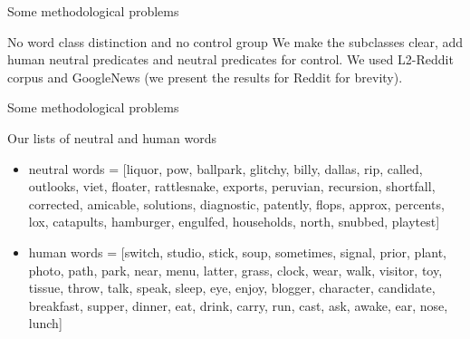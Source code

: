 \documentclass[
  10pt,
  ignorenonframetext,
  x11names, dvipsnames, bibspacing,natbib, table]{beamer}
\begin{document}
\begin{frame}{Some methodological problems}
\protect\hypertarget{some-methodological-problems-1}{}
\begin{block}{No word class distinction and no control group}
\protect\hypertarget{no-word-class-distinction-and-no-control-group}{}
We make the subclasses clear, add human neutral predicates and neutral
predicates for control. We used L2-Reddit corpus and GoogleNews (we
present the results for Reddit for brevity).

\footnotesize 
\begin{table}

\caption{\label{tab:religionTableHeadLate}Rows from extended religion dataset.}
\centering
{}
\end{table}
\normalsize
\end{block}
\end{frame}

\begin{frame}{Some methodological problems}
\protect\hypertarget{some-methodological-problems-2}{}
\begin{block}{Our lists of neutral and human words}
\protect\hypertarget{our-lists-of-neutral-and-human-words}{}
\begin{itemize}
\item
  neutral words = {[}liquor, pow, ballpark, glitchy, billy, dallas, rip,
  called, outlooks, viet, floater, rattlesnake, exports, peruvian,
  recursion, shortfall, corrected, amicable, solutions, diagnostic,
  patently, flops, approx, percents, lox, catapults, hamburger,
  engulfed, households, north, snubbed, playtest{]} \newline
\item
  human words = {[}switch, studio, stick, soup, sometimes, signal,
  prior, plant, photo, path, park, near, menu, latter, grass, clock,
  wear, walk, visitor, toy, tissue, throw, talk, speak, sleep, eye,
  enjoy, blogger, character, candidate, breakfast, supper, dinner, eat,
  drink, carry, run, cast, ask, awake, ear, nose, lunch{]}
\end{itemize}
\end{block}
\end{frame}
\end{document}
